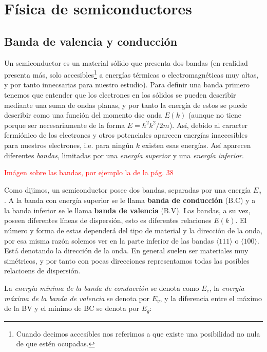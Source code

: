 
\chapter{Física de semiconductores}

\section{Banda de valencia y conducción}

Un semiconductor es un material sólido que presenta dos bandas (en realidad presenta más, solo accesibles\footnote{Cuando decimos accesibles nos referimos a que existe una posibilidad no nula de que estén ocupadas.} a energías térmicas o electromagnéticas muy altas, y por tanto innecsarias para nuestro estudio). Para definir una banda primero tenemos que entender que los electrones en los sólidos se pueden describir mediante una suma de ondas planas, y por tanto la energía de estos se puede describir como una función del momento dse onda $E(k)$ (aunque no tiene porque ser necesariamente de la forma $E=\hbar^2 k^2/2m$). Así, debido al caracter fermiónico de los electrones y otros potenciales aparecen energías inaccesibles para nuestros electrones, i.e. para ningún $k$ existen esas energías. Así aparecen diferentes \textit{bandas}, limitadas por una \textit{energía superior} y una \textit{energía inferior}. 

\begin{Anotacion}
	\textcolor{red}{Imágen sobre las bandas, por ejemplo la de la pág. 38}
\end{Anotacion}

Como dijimos, un semiconductor posee dos bandas, separadas por una energía $E_g$. A la banda con energía superior se le llama \textbf{banda de conducción} (B.C) y a la banda inferior se le llama \textbf{banda de valencia} (B.V). Las bandas, a su vez, poseen diferentes líneas de dispersión, esto es diferentes relaciones $E(k)$. El número y forma de estas dependerá del tipo de material y la dirección de la onda, por esa misma razón solemos ver en la parte inferior de las bandas $\langle 111\rangle $ o $\langle 100\rangle$. Está denotando la dirección de la onda. En general suelen ser materiales muy simétricos, y por tanto con pocas direcciones representamos todas las posibles relacioens de dispersión. 

La \textit{energía mínima de la banda de conducción} se denota como $E_c$, la \textit{energía máxima de la banda de valencia} se denota por $E_v$, y la diferencia entre el máximo de la BV y el mínimo de BC se denota por $E_g$:

